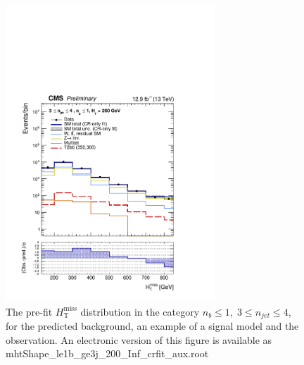 \clearpage
\begin{figure}[tbhp]
    \caption{ 
    The pre-fit $H_{\mathrm{T}}^{\mathrm{miss}}$ distribution in the category $n_{b}\leq 1, \; 3 \leq n_{jet} \leq 4$, 
    for the predicted background, an example of a signal model and the observation.
    An electronic version of this figure is available as mhtShape\_le1b\_ge3j\_200\_Inf\_crfit\_aux.root
    \label{fig:mhtShape_le1b_ge3j_crfit} }
  \begin{center}
  \includegraphics[width=0.7\textwidth]{mhtShape_le1b_ge3j_200_Inf_crfit_aux}
  \end{center}
\end{figure}



